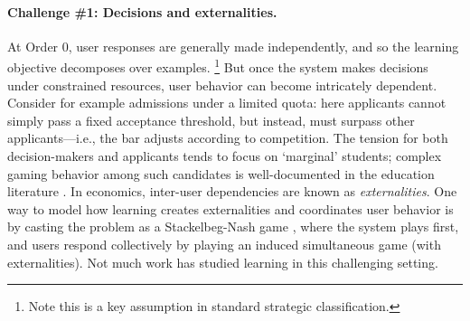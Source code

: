 \paragraph{Challenge \#1: Decisions and externalities.}  
At Order 0, user responses are generally made independently,
and so the learning objective decomposes over examples.%
\footnote{Note this is a key assumption in standard strategic classification.}
But once the system makes decisions under constrained resources,
user behavior can become intricately dependent.
Consider for example admissions under a limited quota:
here applicants cannot simply pass a fixed acceptance threshold,
but instead, must surpass other applicants---i.e., the bar adjusts according to competition.
The tension for both decision-makers and applicants tends
to focus on `marginal' students;
complex gaming behavior among such candidates is well-documented in 
the education literature \citep{bound2009playing}.
In economics, inter-user dependencies are known as \emph{externalities}.
One way to model how learning creates externalities and coordinates user behavior
is by casting the problem as a Stackelbeg-Nash game \citep{liu1998stackelberg},
where the system plays first, and users respond collectively by playing an induced simultaneous game (with externalities).
Not much work has studied
learning in this challenging setting.
{}


